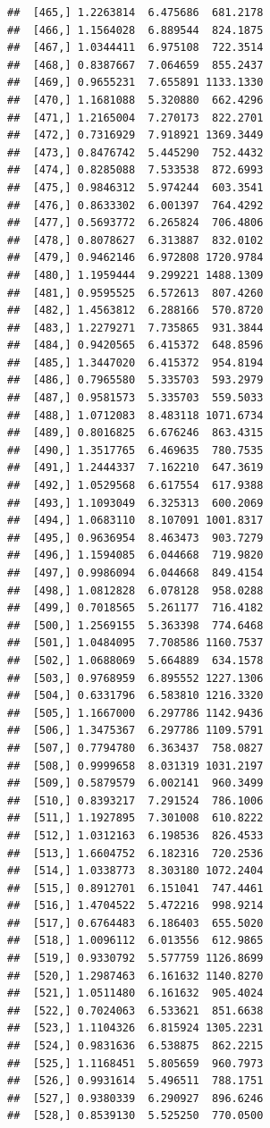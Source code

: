 \documentclass[article]{jss}\usepackage[]{graphicx}\usepackage[]{xcolor}
\makeatletter
\newenvironment{kframe}{%
 \def\at@end@of@kframe{}%
 \ifinner\ifhmode%
  \def\at@end@of@kframe{\end{minipage}}%
  \begin{minipage}{\columnwidth}%
 \fi\fi%
 \def\FrameCommand##1{\hskip\@totalleftmargin \hskip-\fboxsep
 \colorbox{shadecolor}{##1}\hskip-\fboxsep
     \hskip-\linewidth \hskip-\@totalleftmargin \hskip\columnwidth}%
 \MakeFramed {\advance\hsize-\width
   \@totalleftmargin\z@ \linewidth\hsize
   \@setminipage}}%
 {\par\unskip\endMakeFramed%
 \at@end@of@kframe}
\newenvironment{knitrout}{}{} %
\makeatother
\begin{document}
\begin{knitrout}
\begin{kframe}
\begin{verbatim}
##  [465,] 1.2263814  6.475686  681.2178
##  [466,] 1.1564028  6.889544  824.1875
##  [467,] 1.0344411  6.975108  722.3514
##  [468,] 0.8387667  7.064659  855.2437
##  [469,] 0.9655231  7.655891 1133.1330
##  [470,] 1.1681088  5.320880  662.4296
##  [471,] 1.2165004  7.270173  822.2701
##  [472,] 0.7316929  7.918921 1369.3449
##  [473,] 0.8476742  5.445290  752.4432
##  [474,] 0.8285088  7.533538  872.6993
##  [475,] 0.9846312  5.974244  603.3541
##  [476,] 0.8633302  6.001397  764.4292
##  [477,] 0.5693772  6.265824  706.4806
##  [478,] 0.8078627  6.313887  832.0102
##  [479,] 0.9462146  6.972808 1720.9784
##  [480,] 1.1959444  9.299221 1488.1309
##  [481,] 0.9595525  6.572613  807.4260
##  [482,] 1.4563812  6.288166  570.8720
##  [483,] 1.2279271  7.735865  931.3844
##  [484,] 0.9420565  6.415372  648.8596
##  [485,] 1.3447020  6.415372  954.8194
##  [486,] 0.7965580  5.335703  593.2979
##  [487,] 0.9581573  5.335703  559.5033
##  [488,] 1.0712083  8.483118 1071.6734
##  [489,] 0.8016825  6.676246  863.4315
##  [490,] 1.3517765  6.469635  780.7535
##  [491,] 1.2444337  7.162210  647.3619
##  [492,] 1.0529568  6.617554  617.9388
##  [493,] 1.1093049  6.325313  600.2069
##  [494,] 1.0683110  8.107091 1001.8317
##  [495,] 0.9636954  8.463473  903.7279
##  [496,] 1.1594085  6.044668  719.9820
##  [497,] 0.9986094  6.044668  849.4154
##  [498,] 1.0812828  6.078128  958.0288
##  [499,] 0.7018565  5.261177  716.4182
##  [500,] 1.2569155  5.363398  774.6468
##  [501,] 1.0484095  7.708586 1160.7537
##  [502,] 1.0688069  5.664889  634.1578
##  [503,] 0.9768959  6.895552 1227.1306
##  [504,] 0.6331796  6.583810 1216.3320
##  [505,] 1.1667000  6.297786 1142.9436
##  [506,] 1.3475367  6.297786 1109.5791
##  [507,] 0.7794780  6.363437  758.0827
##  [508,] 0.9999658  8.031319 1031.2197
##  [509,] 0.5879579  6.002141  960.3499
##  [510,] 0.8393217  7.291524  786.1006
##  [511,] 1.1927895  7.301008  610.8222
##  [512,] 1.0312163  6.198536  826.4533
##  [513,] 1.6604752  6.182316  720.2536
##  [514,] 1.0338773  8.303180 1072.2404
##  [515,] 0.8912701  6.151041  747.4461
##  [516,] 1.4704522  5.472216  998.9214
##  [517,] 0.6764483  6.186403  655.5020
##  [518,] 1.0096112  6.013556  612.9865
##  [519,] 0.9330792  5.577759 1126.8699
##  [520,] 1.2987463  6.161632 1140.8270
##  [521,] 1.0511480  6.161632  905.4024
##  [522,] 0.7024063  6.533621  851.6638
##  [523,] 1.1104326  6.815924 1305.2231
##  [524,] 0.9831636  6.538875  862.2215
##  [525,] 1.1168451  5.805659  960.7973
##  [526,] 0.9931614  5.496511  788.1751
##  [527,] 0.9380339  6.290927  896.6246
##  [528,] 0.8539130  5.525250  770.0500

\end{verbatim}
\end{kframe}
\end{knitrout}
\end{document}
